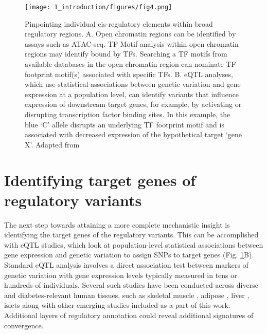 \begin{figure}
        \centering
        \texttt{[image: 1\_introduction/figures/fig4.png]}
        \caption[Pinpointing individual cis-regulatory elements within broad regulatory regions]{Pinpointing individual cis-regulatory elements within broad regulatory regions. A. Open chromatin regions can be identified by assays such as ATAC-seq. TF Motif analysis within open chromatin regions may identify bound by TFs. Searching a TF motifs from available databases in the open chromatin region can nominate TF footprint motif(s) associated with specific TFs. B. eQTL analyses, which use statistical associations between genetic variation and gene expression at a population level, can identify variants that influence expression of downstream target genes, for example, by activating or disrupting transcription factor binding sites. In this example, the blue ‘C’ allele disrupts an underlying TF footprint motif and is associated with decreased expression of the hypothetical target ‘gene X’. Adapted from \cite{kyonoGenomicAnnotationDiseaseassociated2019}}
        \label{fig:ci_f4}
\end{figure}


\section{Identifying target genes of regulatory variants}
The next step towards attaining a more complete mechanistic insight is identifying the target genes of the regulatory variants. This can be accomplished with \ac{eQTL} studies, which look at population-level statistical associations between gene expression and genetic variation to assign SNPs to target genes (Fig. \ref{fig:ci_f4}B). Standard eQTL analysis involves a direct association test between markers of genetic variation with gene expression levels typically measured in tens or hundreds of individuals. Several such studies have been conducted across diverse and diabetes-relevant human tissues, such as skeletal muscle \cite{scottGeneticRegulatorySignature2016}, adipose \cite{civelekGeneticRegulationAdipose2017}, liver \cite{gtexconsortiumGeneticEffectsGene2017} , islets \cite{fadistaGlobalGenomicTranscriptomic2014, buntTranscriptExpressionData2015, varshneyGeneticRegulatorySignatures2017} along with other emerging studies included as a part of this work. Additional layers of regulatory annotation could reveal additional signatures of convergence.


